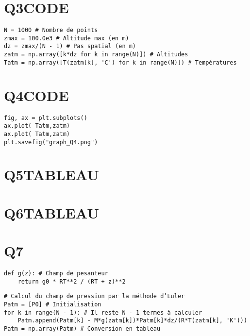 \documentclass[11pt]{article}
\begin{document}
\section{Q3\hfill{}\textsc{CODE}}
\label{sec:org27879d9}

\begin{verbatim}
N = 1000 # Nombre de points
zmax = 100.0e3 # Altitude max (en m)
dz = zmax/(N - 1) # Pas spatial (en m)
zatm = np.array([k*dz for k in range(N)]) # Altitudes
Tatm = np.array([T(zatm[k], 'C') for k in range(N)]) # Températures
\end{verbatim}


\section{Q4\hfill{}\textsc{CODE}}
\label{sec:org738aa1a}

\begin{verbatim}
fig, ax = plt.subplots()
ax.plot( Tatm,zatm)
ax.plot( Tatm,zatm)
plt.savefig("graph_Q4.png")
\end{verbatim}


\section{Q5\hfill{}\textsc{TABLEAU}}
\label{sec:org056afa7}

\section{Q6\hfill{}\textsc{TABLEAU}}
\label{sec:orga425a0b}

\section{Q7}
\label{sec:orgba448f9}

\begin{verbatim}
def g(z): # Champ de pesanteur
    return g0 * RT**2 / (RT + z)**2
\end{verbatim}

\begin{verbatim}
# Calcul du champ de pression par la méthode d’Euler
Patm = [P0] # Initialisation
for k in range(N - 1): # Il reste N - 1 termes à calculer
    Patm.append(Patm[k] - M*g(zatm[k])*Patm[k]*dz/(R*T(zatm[k], 'K')))
Patm = np.array(Patm) # Conversion en tableau
\end{verbatim}
\end{document}
